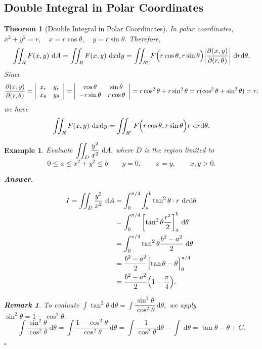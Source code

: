 \documentclass[12pt,a4paper]{article}
\newtheorem{thm}{Theorem}[subsection]
\newtheorem{eg}{Example}[subsection]
\newenvironment*{ans}{\par\indent\textbf{\textit{Answer. }}\par}{\par\hfill{$\square$}\par}
\newtheorem*{rmk}{\indent Remark}
\def\dsst{\displaystyle}
\def\d{{\mathrm{d}}}
\def\dx{\d x}
\def\del{\partial}
\def\iintR{\dsst\iint_R}
\def\iintD{\dsst\iint_D}
\begin{document}
\subsection{Double Integral in Polar Coordinates}
\begin{thm}[Double Integral in Polar Coordinates]
	In polar coordinates, $x^2+y^2=r,\quad x=r\cos\theta,\quad y=r\sin\theta.$ Therefore, 	\[\iintR F(x,y)\ \d A=\iintR F(x,y)\ \dx\d y=\iint_{R'}F\qty\Big(r\cos\theta,r\sin\theta)\qty|\dfrac{\del(x,y)}{\del(r,\theta)}|\ \d r\d\theta.\] Since \[\dsst\dfrac{\del(x,y)}{\del(r,\theta)}=\qty|\begin{array}{cc}x_r&y_r\\x_\theta&y_\theta\end{array}|=\qty|\begin{array}{cc}\cos\theta&\sin\theta\\-r\sin\theta&r\cos\theta\end{array}|=r\cos^2\theta+r\sin^2\theta=r(\cos^2\theta+\sin^2\theta)=r,\] we have \[\iintR F(x,y)\ \dx\d y=\iint_{R'}F\qty\Big(r\cos\theta,r\sin\theta)r\ \d r\d\theta.\]
\end{thm}
\begin{eg}
	Evaluate $\dsst\iintD\dfrac{y^2}{x^2}\ \d A,$ where $D$ is the region limited to \[0\leq a\leq x^2+y^2\leq b\qquad y=0,\qquad x=y,\qquad x,y>0.\]
	\begin{ans}
		\[\begin{aligned}I=\iintD\dfrac{y^2}{x^2}\ \d A&=\int_0^{\pi/4}\int_a^b\tan^2\theta\cdot r\ \d r\d\theta\\&=\int_0^{\pi/4}\qty[\tan^2\theta\dfrac{r^2}{2}]_a^b\ \d\theta\\&=\int_0^{\pi/4}\tan^2\theta\dfrac{b^2-a^2}{2}\ \d\theta\\&=\dfrac{b^2-a^2}{2}\qty\Big[\tan\theta-\theta]_0^{\pi/4}\\&=\dfrac{b^2-a^2}{2}\qty(1-\dfrac{\pi}{4}).\end{aligned}\]
		\begin{rmk}
			To evaluate $\dsst\int\tan^2\theta\ \d\theta=\int\dfrac{\sin^2\theta}{\cos^2\theta}\ \d\theta,$ we apply $\sin^2\theta=1-\cos^2\theta:$ \[\int\dfrac{\sin^2\theta}{\cos^2\theta}\ \d\theta=\int\dfrac{1-\cos^2\theta}{\cos^2\theta}\ \d\theta=\int\dfrac{1}{\cos^2\theta}\d\theta-\int\ \d\theta=\tan\theta-\theta+C.\]
		\end{rmk}
	\end{ans}
\end{eg}
\end{document}
